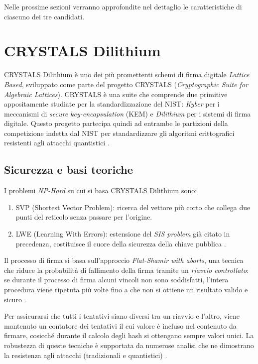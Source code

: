 Nelle prossime sezioni verranno approfondite nel dettaglio le caratteristiche di ciascuno dei tre candidati.

\section{CRYSTALS Dilithium}

CRYSTALS Dilithium è uno dei più promettenti schemi di firma digitale \textit{Lattice Based}, sviluppato come parte del progetto CRYSTALS (\textit{Cryptographic Suite for Algebraic Lattices})\cite{crystals-dilithium-website}. CRYSTALS è una suite che comprende due primitive appositamente studiate per la standardizzazione del NIST: \textit{Kyber} per i meccanismi di \textit{secure key-encapsulation} (KEM) e \textit{Dilithium} per i sistemi di firma digitale. Questo progetto partecipa quindi ad entrambe le partizioni della competizione indetta dal NIST per standardizzare gli algoritmi crittografici resistenti agli attacchi quantistici \cite{crystals-website}.

\subsection{Sicurezza e basi teoriche}

I problemi \textit{NP-Hard} su cui si basa CRYSTALS Dilithium sono:
\begin{enumerate}
    \item SVP (Shortest Vector Problem): ricerca del vettore più corto che collega due punti del reticolo senza passare per l'origine.
    \item LWE (Learning With Errors): estensione del \textit{SIS problem} già citato in precedenza, costituisce il cuore della sicurezza della chiave pubblica \cite{NISTthirdReport}.
\end{enumerate}

Il processo di firma si basa sull'approccio \textit{Flat-Shamir with aborts}, una tecnica che riduce la probabilità di fallimento della firma tramite un \textit{riavvio controllato}: se durante il processo di firma alcuni vincoli non sono soddisfatti, l'intera procedura viene ripetuta più volte fino a che non si ottiene un risultato valido e sicuro \cite{crystalsdilithium-submissionpackage-one}.

Per assicurarsi che tutti i tentativi siano diversi tra un riavvio e l'altro, viene mantenuto un contatore dei tentativi il cui valore è incluso nel contenuto da firmare, cosicché durante il calcolo degli hash si ottengano sempre valori unici. La robustezza di queste tecniche è supportata da numerose analisi che ne dimostrano la resistenza agli attacchi (tradizionali e quantistici) \cite{crystalsdilithium-submissionpackage-one}.

